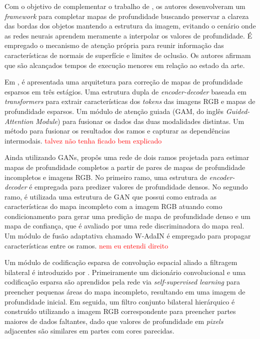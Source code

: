 Com o objetivo de complementar o trabalho de , os autores  desenvolveram um \textit{framework} para completar mapas de profundidade buscando preservar a clareza das bordas dos objetos mantendo a estrutura da imagem, evitando o cenário onde as redes neurais aprendem meramente a interpolar os valores de profundidade. É empregado o mecanismo de atenção própria para reunir informação das características de normais de superfície e limites de oclusão. Os autores afirmam que são alcançados tempos de execução menores em relação ao estado da arte.


Em , é apresentada uma arquitetura para correção de mapas de profundidade esparsos em três estágios. Uma estrutura dupla de \textit{encoder-decoder} baseada em \textit{transformers} para extrair características dos \textit{tokens} das imagens RGB e mapas de profundidade esparsos. Um módulo de atenção guiada (GAM, do inglês \textit{Guided-Attention Module}) para fusionar os dados das duas modalidades distintas. Um método para fusionar os resultados dos ramos e capturar as dependências intermodais. \textcolor{red}{talvez não tenha ficado bem explicado}


Ainda utilizando GANs,  propôs uma rede de dois ramos projetada para estimar mapas de profundidade completos a partir de pares de mapas de profundidade incompletos e imagens RGB. No primeiro ramo, uma estrutura de \textit{encoder-decoder} é empregada para predizer valores de profundidade densos. No segundo ramo, é utilizada uma estrutura de GAN que possui como entrada as características do mapa incompleto com a imagem RGB atuando como condicionamento para gerar uma predição de mapa de profundidade denso e um mapa de confiança, que é avaliado por uma rede discriminadora do mapa real. Um módulo de fusão adaptativa chamado W-AdaIN é empregado para propagar características entre os ramos. \textcolor{red}{nem eu entendi direito}


Um módulo de codificação esparsa de convolução espacial aliado a filtragem bilateral é introduzido por . Primeiramente um dicionário convolucional e uma codificação esparsa são aprendidos pela rede via \textit{self-supervised learning} para preencher pequenas áreas do mapa incompleto, resultando em uma imagem de profundidade inicial. Em seguida, um filtro conjunto bilateral hierárquico é construído utilizando a imagem RGB correspondente para preencher partes maiores de dados faltantes, dado que valores de profundidade em \textit{pixels} adjacentes são similares em partes com cores parecidas.



